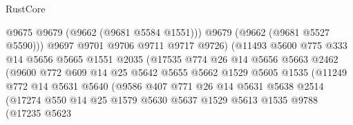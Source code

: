 \begin{lexlean}{RustCore}
\begin{coremodule}
                                  @9675
                                  @9679
                                  (@9662 (@9681 @5584 @1551)))
                                @9679
                                (@9662 (@9681 @5527 @5590)))
                              @9697
                              @9701
                              @9706
                              @9711
                              @9717
                              @9726)
                            (@11493
                              @5600
                              @775
                              @333
                              @14
                              @5656
                              @5665
                              @1551
                              @2035
                              (@17535
                                @774
                                @26
                                @14
                                @5656
                                @5663
                                @2462
                                (@9600
                                  @772
                                  @609
                                  @14
                                  @25
                                  @5642
                                  @5655
                                  @5662
                                  @1529
                                  @5605
                                  @1535
                                  (@11249
                                    @772
                                    @14
                                    @5631
                                    @5640
                                    (@9586
                                      @407
                                      @771
                                      @26
                                      @14
                                      @5631
                                      @5638
                                      @2514
                                      (@17274
                                        @550
                                        @14
                                        @25
                                        @1579
                                        @5630
                                        @5637
                                        @1529
                                        @5613
                                        @1535
                                        @9788
                                        (@17235
                                          @5623

\end{coremodule}
\end{lexlean}
